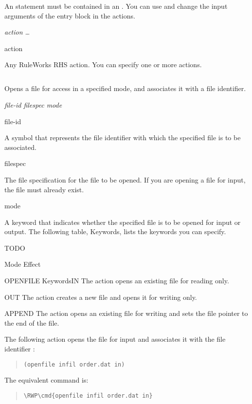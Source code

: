 {{An  statement must be contained in an . You
can use and change the input arguments of the entry block in
the  actions.

\Format

 \it{action} \ldots

\begin{arguments}
\item[action]

  Any RuleWorks RHS action. You can specify one or more actions.
\end{arguments}

\subsection{}

Opens a file for access in a specified mode, and associates it with a
file identifier.

\Format

 \it{file-id} \it{filespec} \it{mode}

\begin{arguments}
\item[file-id]

  A symbol that represents the file identifier with which the
  specified file is to be associated.

\item[filespec]

  The file specification for the file to be opened. If you are opening
  a file for input, the file must already exist.

\item[mode]

  A keyword that indicates whether the specified file is to be opened
  for input or output. The following table,  Keywords,
  lists the keywords you can specify.
\end{arguments}

TODO

Mode  Effect

OPENFILE KeywordsIN  The action opens an existing file for
reading only.

OUT  The action creates a new file and opens it for writing
only.

APPEND  The action opens an existing file for writing and
sets the file pointer to the end of the file.

\Example

The following action opens the file  for input and
associates it with the file identifier :
\begin{quote}
\begin{verbatim}
(openfile infil order.dat in)
\end{verbatim}
\end{quote}
The equivalent command is:
\begin{quote}
\begin{Verbatim}[commandchars=\\\{\}]
\RWP\cmd{openfile infil order.dat in}
\end{Verbatim}
\end{quote}

}}
